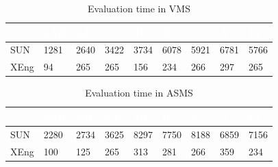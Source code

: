\begin{table}[h!]

\begin{tabular}{|>{\small}l|>{\small}l|>{\small}l|>{\small}l|>{\small}l|>{\small}l|>{\small}l|>{\small}l|>{\small}l|}     
\hline  \rowcolor{black} \scriptsize \bf \textcolor {white}{}
& \scriptsize \bf \textcolor {white}{SAR}
& \scriptsize \bf \textcolor {white}{AR}
& \scriptsize \bf \textcolor  {white}{SA}
& \scriptsize \bf \textcolor  {white}{SR}
& \scriptsize \bf \textcolor  {white}{R}

& \scriptsize \bf \textcolor  {white}{S} 
& \scriptsize \bf \textcolor  {white}{A}

& \scriptsize \bf \textcolor {white}{IA}\\ \hline

\scriptsize  {SUN }
& \scriptsize  {1281}
& \scriptsize {2640}
& \scriptsize {3422}
& \scriptsize {3734}
& \scriptsize {6078}

& \scriptsize {5921}
& \scriptsize {6781}
& \scriptsize {5766}
  \\ \hline
\scriptsize  {XEng}
& \scriptsize  {94}
& \scriptsize {265}
& \scriptsize {265}
& \scriptsize {156}
& \scriptsize {234}

& \scriptsize {266}
& \scriptsize {297}
& \scriptsize {265}
  \\ \hline
\end{tabular}
\caption{Evaluation time in VMS}\end{table}


\begin{table}[h!]
\centering
\begin{tabular}{|>{\small}l|>{\small}l|>{\small}l|>{\small}l|>{\small}l|>{\small}l|>{\small}l|>{\small}l|>{\small}l|}   
\hline  \rowcolor{black} \scriptsize \bf \textcolor {white}{}
& \scriptsize \bf \textcolor {white}{SAR}
& \scriptsize \bf \textcolor {white}{AR}
& \scriptsize \bf \textcolor  {white}{SA}
& \scriptsize \bf \textcolor  {white}{SR}
& \scriptsize \bf \textcolor  {white}{R}

& \scriptsize \bf \textcolor  {white}{S} 
& \scriptsize \bf \textcolor  {white}{A}
& \scriptsize \bf \textcolor {white}{IA}\\ \hline
\scriptsize  {SUN }
& \scriptsize  {2280}
& \scriptsize {2734}
& \scriptsize {3625}
& \scriptsize {8297}
& \scriptsize {7750}

& \scriptsize {8188}
& \scriptsize {6859}
& \scriptsize {7156}
  \\ \hline
\scriptsize  {XEng}
& \scriptsize  {100}
& \scriptsize {125}
& \scriptsize {265}
& \scriptsize {313}
& \scriptsize {281}

& \scriptsize {266}
& \scriptsize {359}
& \scriptsize {234}
  \\ \hline
\end{tabular}
\caption{Evaluation time in ASMS}\end{table}


